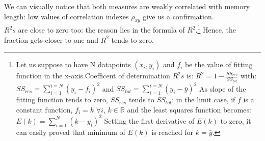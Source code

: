 We can visually notice that both measures are weakly correlated with
memory length: low values of correlation indexes
$\rho_{xy}$ give us a confirmation.\\
$R^2s$ are close to zero too: the reason lies in the  formula
of $R^2$.\footnote{Let us suppose to have N datapoints
$(x_i,y_i)$ and $f_i$ be the
value of fitting function in the x-axis.Coefficent of determination
$R^2s$ is: $R^{2}= 1-{\frac {SS_{ res}}  {SS_{ tot}}}$
with:
$SS_{ res}=\sum_{i=1}^{i=N}{(y_i - f_i)^2}$
and
$SS_{ tot}=\sum_{i=1}^{i=N}{(y_i - \bar{y})^2}$
As slope of the fitting function tends to zero, $SS_{res}$ tends
to $SS_{tot}$: in the limit case, if $f$ is a constant function,
$f_i=k$ $\forall  i$,  $k \in  \mathbb{R}$ and the least
squares function becomes: $E(k)= \sum_{i=1}^{N}{(k-y_i)^2} $
Setting the first derivative of $E(k)$ to zero, it can easily proved
that minimum of $E(k)$ is reached for $k=\bar{y}$.}
Hence, the fraction gets closer to one and $R^2$ tends to zero.
